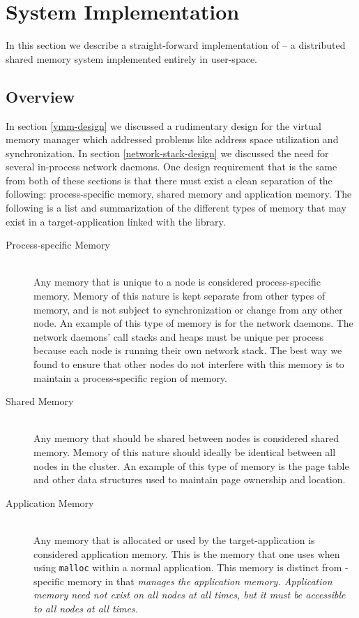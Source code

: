 \section{System Implementation}

In this section we describe a straight-forward implementation of \projname{} -- a distributed shared memory system implemented entirely in user-space.

\subsection{Overview}
In section \ref{vmm-design} we discussed a rudimentary design for the virtual memory manager which addressed problems like address space utilization and synchronization.  In section \ref{network-stack-design} we discussed the need for several in-process network daemons.  One design requirement that is the same from both of these sections is that there must exist a clean separation of the following: process-specific memory, shared memory and application memory.  The following is a list and summarization of the different types of memory that may exist in a target-application linked with the \projname{} library.

\begin{description}
\item[Process-specific Memory] \hfill \\
Any memory that is unique to a \projname{} node is considered process-specific memory.  Memory of this nature is kept separate from other types of memory, and is not subject to synchronization or change from any other node.  An example of this type of memory is for the network daemons.  The network daemons' call stacks and heaps must be unique per process because each node is running their own network stack.  The best way we found to ensure that other nodes do not interfere with this memory is to maintain a process-specific region of memory.

\item[Shared Memory] \hfill \\
Any memory that should be shared between \projname{} nodes is considered shared memory.  Memory of this nature should ideally be identical between all nodes in the cluster.  An example of this type of memory is the page table and other data structures used to maintain page ownership and location.

\item[Application Memory] \hfill \\
Any memory that is allocated or used by the target-application is considered application memory.  This is the memory that one uses when using \verb,malloc, within a normal application.  This memory is distinct from \projname{}-specific memory in that \projname{} \em manages \em the application memory.  Application memory need not exist on all nodes at all times, but it must be accessible to all nodes at all times.
\end{description}


